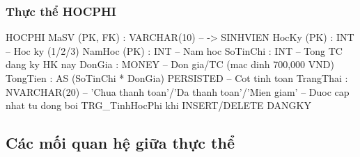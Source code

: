 \documentclass[13pt, a4paper]{article}
\begin{document}
\subsubsection{Thực thể HOCPHI}
\begin{sqlbox}
HOCPHI {
   MaSV (PK, FK)  : VARCHAR(10)   -- -> SINHVIEN
   HocKy (PK)     : INT           -- Hoc ky (1/2/3)
   NamHoc (PK)    : INT           -- Nam hoc
   SoTinChi       : INT           -- Tong TC dang ky HK nay
   DonGia         : MONEY         -- Don gia/TC (mac dinh 700,000 VND)
   TongTien       : AS (SoTinChi * DonGia) PERSISTED  -- Cot tinh toan
   TrangThai      : NVARCHAR(20)  -- 'Chua thanh toan'/'Da thanh toan'/'Mien giam'
   -- Duoc cap nhat tu dong boi TRG_TinhHocPhi khi INSERT/DELETE DANGKY
}
\end{sqlbox}

\subsection{Các mối quan hệ giữa thực thể}
\end{document}
